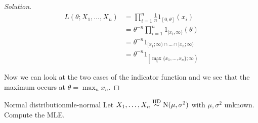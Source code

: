 \documentclass[12pt]{extarticle}
\newcommand{\Normal}{{\operatorfont N}}
\begin{document}
\begin{proof}[Solution]
    \begin{align}
        L(\theta; X_1, \dots, X_n) & = \prod_{i = 1}^n \frac{1}{n} 1_{[0, \theta]}(x_i)                \\
                                   & =\theta^{-n} \prod_{i = 1}^n 1_{[x_i, \infty)} (\theta)           \\ %
                                   & = \theta^{-n} 1_{[x_1; \infty) \cap \dots \cap [x_n; \infty)}     \\
                                   & = \theta^{-n} 1_{\left[\max_n \{x_1, \dots, x_n\}; \infty\right)}
    \end{align}

    Now we can look at the two cases of the indicator function and we see that the maximum occurs at $\hat \theta = \max_n x_n$.
\end{proof}

\begin{example}{Normal distribution}{mle-normal}
    Let $X_1, \dots, X_n \stackrel{\text{IID}}{\sim} \Normal(\mu,\sigma^2)$ with $\mu,\sigma^2$ unknown.
    Compute the MLE.
\end{example}
\end{document}
